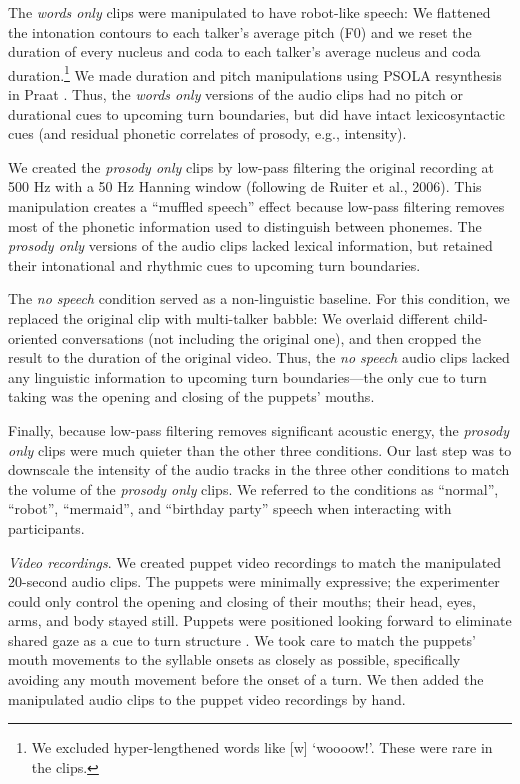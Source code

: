 \documentclass[authoryear, 12pt]{elsarticle}
\begin{document}
The \textit{words only} clips were manipulated to have robot-like speech: We flattened the intonation contours to each talker's average pitch (F0) and we reset the duration of every nucleus and coda to each talker's average nucleus and coda duration.\footnote{We excluded hyper-lengthened words like [w] `woooow!'. These were rare in the clips.} We made duration and pitch manipulations using PSOLA resynthesis in Praat \citep{Praat}. Thus, the \textit{words only} versions of the audio clips had no pitch or durational cues to upcoming turn boundaries, but did have intact lexicosyntactic cues (and residual phonetic correlates of prosody, e.g., intensity). 

We created the \textit{prosody only} clips by low-pass filtering the original recording at 500 Hz with a 50 Hz Hanning window (following de Ruiter et al., 2006). This manipulation creates a ``muffled speech'' effect because low-pass filtering removes most of the phonetic information used to distinguish between phonemes. The \textit{prosody only} versions of the audio clips lacked lexical information, but retained their intonational and rhythmic cues to upcoming turn boundaries. 

The \textit{no speech} condition served as a non-linguistic baseline. For this condition, we replaced the original clip with multi-talker babble: We overlaid different child-oriented conversations (not including the original one), and then cropped the result to the duration of the original video. Thus, the \textit{no speech} audio clips lacked any linguistic information to upcoming turn boundaries---the only cue to turn taking was the opening and closing of the puppets' mouths. 

Finally, because low-pass filtering removes significant acoustic energy, the \textit{prosody only} clips were much quieter than the other three conditions. Our last step was to downscale the intensity of the audio tracks in the three other conditions to match the volume of the \textit{prosody only} clips. We referred to the conditions as ``normal'', ``robot'', ``mermaid'', and ``birthday party'' speech when interacting with participants.

\textit{Video recordings}. We created puppet video recordings to match the manipulated 20-second audio clips. The puppets were minimally expressive; the experimenter could only control the opening and closing of their mouths; their head, eyes, arms, and body stayed still. Puppets were positioned looking forward to eliminate shared gaze as a cue to turn structure \citep{thorgrimsson2015}. We took care to match the puppets' mouth movements to the syllable onsets as closely as possible, specifically avoiding any mouth movement before the onset of a turn. We then added the manipulated audio clips to the puppet video recordings by hand.
\end{document}
